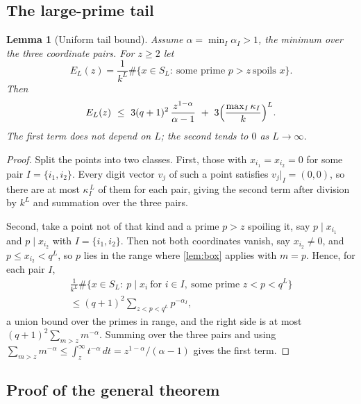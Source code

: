 \documentclass[11pt]{amsart}
\newtheorem{lemma}[theorem]{Lemma}
\theoremstyle{definition}
\theoremstyle{remark}
\begin{document}
\subsection*{The large-prime tail}

\begin{lemma}[Uniform tail bound]
\label{lem:tail}
Assume $\alpha=\min_I\alpha_I>1$, the minimum over the three coordinate pairs. For $z\ge2$ let
\[
E_L(z)=\frac1{k^L}\#\{x\in S_L:\ \text{some prime }p>z\ \text{spoils }x\}.
\]
Then
\[
E_L(z)\ \le\ 3(q+1)^2\,\frac{z^{1-\alpha}}{\alpha-1}\ +\ 3\Bigl(\frac{\max_I\kappa_I}{k}\Bigr)^{L}.
\]
The first term does not depend on $L$; the second tends to $0$ as $L\to\infty$.
\end{lemma}

\begin{proof}
Split the points into two classes. First, those with $x_{i_1}=x_{i_2}=0$ for some pair $I=\{i_1,i_2\}$. Every digit vector $v_j$ of such a point satisfies $v_j|_I=(0,0)$, so there are at most $\kappa_I^{\,L}$ of them for each pair, giving the second term after division by $k^L$ and summation over the three pairs.

Second, take a point not of that kind and a prime $p>z$ spoiling it, say $p\mid x_{i_1}$ and $p\mid x_{i_2}$ with $I=\{i_1,i_2\}$. Then not both coordinates vanish, say $x_{i_2}\ne0$, and $p\le x_{i_2}<q^L$, so $p$ lies in the range where \cref{lem:box} applies with $m=p$. Hence, for each pair $I$,
\begin{multline*}
\frac1{k^L}\#\bigl\{x\in S_L:\ p\mid x_i\ \text{for } i\in I,\ \text{some prime } z<p<q^L\bigr\}\\
\le(q+1)^2\!\!\sum_{z<p<q^L}\!\!p^{-\alpha_I},
\end{multline*}
a union bound over the primes in range, and the right side is at most $(q+1)^2\sum_{m>z}m^{-\alpha}$. Summing over the three pairs and using $\sum_{m>z}m^{-\alpha}\le\int_z^\infty t^{-\alpha}\,dt=z^{1-\alpha}/(\alpha-1)$ gives the first term. \qedhere
\end{proof}

\subsection*{Proof of the general theorem}
\end{document}
